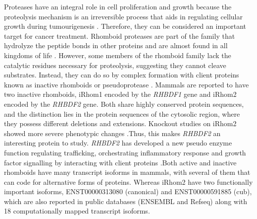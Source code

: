 \documentclass[fleqn,10pt,lineno]{wlpeerj}
\begin{document}
Proteases have an integral role in cell proliferation and growth because the proteolysis mechanism is an irreversible process that aids in regulating cellular growth during tumourigenesis \citep{Park2020}. Therefore, they can be considered an important target for cancer treatment. Rhomboid proteases are part of the family that hydrolyze the peptide bonds in other proteins and are almost found in all kingdoms of life \citep{Adrain2020}. However, some members of the rhomboid family lack the catalytic residues necessary for proteolysis, suggesting they cannot cleave substrates. Instead, they can do so by complex formation with client proteins known as inactive rhomboids or pseudoprotease \citep{Bergbold2013}. Mammals are reported to have two inactive rhomboids, iRhom1 encoded by the \textit{RHBDF1} gene and iRhom2 encoded by the \textit{RHBDF2} gene. Both share highly conserved protein sequences, and the distinction lies in the protein sequences of the cytosolic region, where they possess different deletions and extensions. Knockout studies on iRhom2 showed more severe phenotypic changes \citep{Blaydon2012,Hosur2014,Dulloo2019}.Thus, this makes \textit{RHBDF2} an interesting protein to study. \textit{RHBDF2} has developed a new pseudo enzyme function regulating trafficking, orchestrating inflammatory response and growth factor signalling by interacting with client proteins \citep{Bergbold2013}.Both active and inactive rhomboids have many transcript isoforms in mammals, with several of them that can code for alternative forms of proteins. Whereas iRhom2 have two functionally important isoforms, ENST00000313080 (canonical) and ENST00000591885 (cub), which are also reported in public databases (ENSEMBL and Refseq) along with 18 computationally mapped transcript isoforms. 
\end{document}
